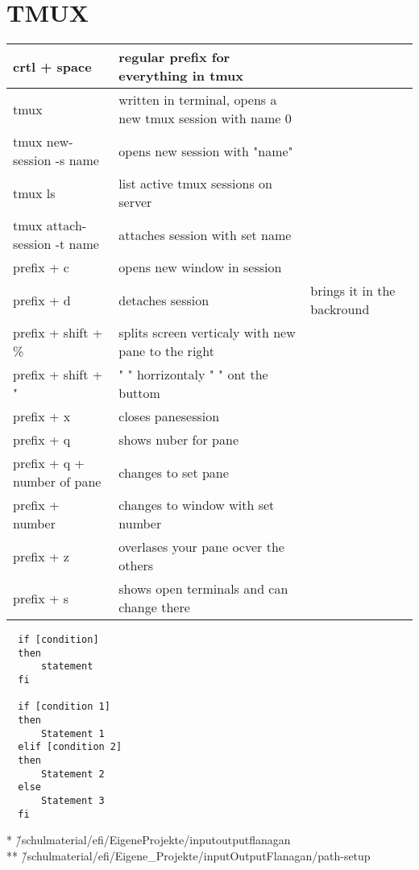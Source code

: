 \documentclass[12pt]{article}
\begin{document}
\section*{TMUX}

\begin{tabular}{| p{6.5cm} | p{6.5cm} | p{6.5cm} |}
    \hline
    crtl + space & regular prefix for everything in tmux & \\
    \hline
    tmux & written in terminal, opens a new tmux session with name 0 & \\
    \hline
    tmux new-session -s name & opens new session with "name" & \\
    \hline 
    tmux ls & list active tmux sessions on server & \\
    \hline
    tmux attach-session -t name & attaches session with set name & \\
    \hline 
    prefix + c & opens new window in session & \\
    \hline
    prefix + d & detaches session & brings it in the backround \\
    \hline
    prefix + shift + \% & splits screen verticaly with new pane to the right & \\
    \hline
    prefix + shift + " & " " horrizontaly " " ont the buttom & \\
    \hline 
    prefix + x & closes pane\/session & \\
    \hline 
    prefix + q & shows nuber for pane & \\
    \hline 
    prefix + q + number of pane & changes to set pane & \\
    \hline
    prefix + number & changes to window with set number & \\
    \hline
    prefix + z & overlases your pane ocver the others & \\
    \hline
    prefix + s & shows open terminals and can change there & \\
    \hline
\end{tabular}
\newpage


  \lstset{language=sh}
  \begin{lstlisting} 
  if [condition]
  then
      statement 
  fi

  if [condition 1]
  then 
      Statement 1
  elif [condition 2]
  then
      Statement 2
  else 
      Statement 3
  fi

  \end{lstlisting}

* \~/schulmaterial/efi/EigeneProjekte/inputoutputflanagan \\
** \~/schulmaterial/efi/Eigene\_Projekte/inputOutputFlanagan/path-setup 
\end{document}
